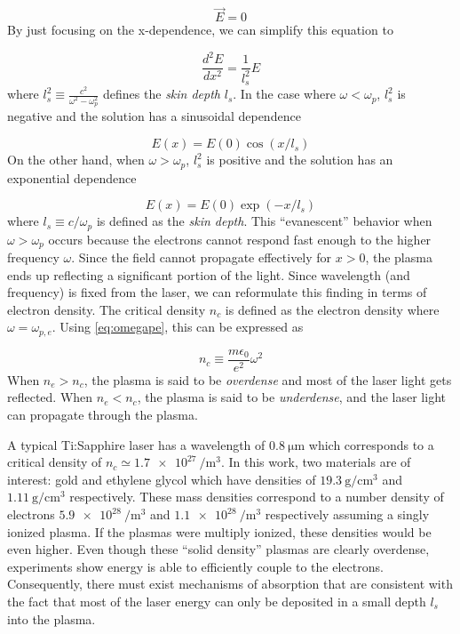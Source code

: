 \begin{equation}
	[\nabla^2 + \frac{\omega^2}{c^2}(1 - \frac{\omega_p^2}{\omega^2})] \vec{E} = 0
\end{equation}
By just focusing on the x-dependence, we can simplify this equation to 

\begin{equation}
	\frac{d^2 E}{d x^2} = \frac{1}{l_s^2}  E
\end{equation}
where $l_s^2 \equiv \frac{c^2}{\omega^2 - \omega_p^2}$ defines the \emph{skin depth} $l_s$. In the case where $\omega < \omega_p$, $l_s^2$ is negative and the solution has a sinusoidal dependence

\begin{equation}
	E(x) = E(0) \cos(x / l_s)
\end{equation}
On the other hand, when $\omega > \omega_p$, $l_s^2$ is positive and the solution has an exponential dependence

\begin{equation}
	E(x) = E(0) \exp(-x / l_s)
\end{equation}
where $l_s \equiv c / \omega_p$ is defined as the \emph{skin depth}. This ``evanescent'' behavior when $\omega > \omega_p$ occurs because the electrons cannot respond fast enough to the higher frequency $\omega$. Since the field cannot propagate effectively for $x > 0$, the plasma ends up reflecting a significant portion of the light. Since wavelength (and frequency) is fixed from the laser, we can reformulate this finding in terms of electron density. The critical density $n_c$ is defined as the electron density where $\omega = \omega_{p,e}$. Using \cref{eq:omegape}, this can be expressed as

\begin{equation}
	n_c \equiv \frac{m \epsilon_0}{e^2} \omega^2 \label{eq:criticaldensity}
\end{equation}
When $n_e > n_c$, the plasma is said to be \emph{overdense} and most of the laser light gets reflected. When $n_e < n_c$, the plasma is said to be \emph{underdense}, and the laser light can propagate through the plasma. 

A typical Ti:Sapphire laser has a wavelength of $\SI{0.8}{\micro \meter}$ which corresponds to a critical density of $n_c \simeq \SI{1.7e27}{\per \meter \cubed}$. In this work, two materials are of interest: gold and ethylene glycol which have densities of $\SI{19.3}{\gram \per \centi \meter \cubed}$ and $\SI{1.11}{\gram \per \centi \meter \cubed}$ respectively. These mass densities correspond to a number density of electrons $\SI{5.9e28}{\per \meter \cubed}$ and $\SI{1.1e28}{\per \meter \cubed}$ respectively assuming a singly ionized plasma. If the plasmas were multiply ionized, these densities would be even higher. Even though these ``solid density'' plasmas are clearly overdense, experiments show energy is able to efficiently couple to the electrons. Consequently, there must exist mechanisms of absorption that are consistent with the fact that most of the laser energy can only be deposited in a small depth $l_s$ into the plasma. 

